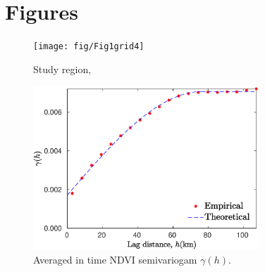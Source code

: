 {%
\newpage
\section*{Figures}

\begin{figure}[!htbp]
\begin{center}
\texttt{[image: fig/Fig1grid4]}
\vspace*{-0.1in}
\caption{Study region,  }
\label{fig:study_area}
\end{center}
\end{figure}

\begin{figure}[!htbp]
\begce
\includegraphics[width=8.5cm]{fig/SemivariogramNDVI225x2251}
\endce
\caption{Averaged in time NDVI semivariogam $\gamma(h)$.}
\label{fig:semivariance}
\end{figure}

}
